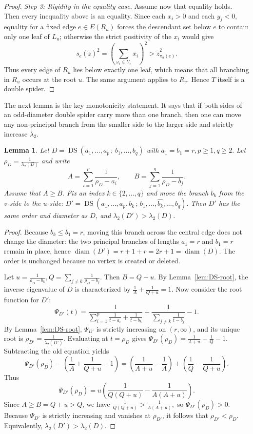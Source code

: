 \documentclass[11pt]{article}
\newtheorem{lemma}[theorem]{Lemma}
\theoremstyle{remark}
\newcommand{\diam}{\operatorname{diam}}
\newcommand{\DS}{\operatorname{DS}}
\begin{document}
\begin{proof}
\smallskip
\noindent\emph{Step 3: Rigidity in the equality case.}
Assume now that equality holds. Then every inequality above is an equality. Since each $x_i>0$
and each $y_j<0$, equality for a fixed edge $e\in E(R_u)$ forces the descendant set below $e$ to
contain only one leaf of $L_u$; otherwise the strict positivity of the $x_i$ would give
$$
s_e(\widetilde z)^2=
\left(\sum_{\omega_i\in U_e}x_i\right)^2>
\widetilde z_{\pi_u(e)}^2.
$$
Thus every edge of $R_u$ lies below exactly one leaf, which means that all branching in $R_u$
occurs at the root $u$. The same argument applies to $R_v$. Hence $T$ itself is a double spider.
\end{proof}

The next lemma is the key monotonicity statement.
It says that if both sides of an odd-diameter double spider carry more than one branch, then one can move any non-principal branch from the smaller side to the larger side and strictly increase $\lambda_2$.

\begin{lemma}\label{lem:arm-transfer}
Let
$D=\DS(a_1,\dots,a_p\,;\,b_1,\dots,b_q)$
with
$a_1=b_1=r, p\ge 1, q\ge 2.$
Let
$\rho_D=\frac{1}{\lambda_2(D)}$
and write
$$
A=\sum_{i=1}^p \frac{1}{\rho_D-a_i},
\qquad
B=\sum_{j=1}^q \frac{1}{\rho_D-b_j}.
$$
Assume that
$A\ge B.$
Fix an index $k\in\{2,\dots,q\}$ and move the branch $b_k$ from the $v$-side to the $u$-side:
$D'=\DS(a_1,\dots,a_p,b_k\,;\,b_1,\dots,\widehat{b_k},\dots,b_q).$
Then $D'$ has the same order and diameter as $D$, and
$\lambda_2(D')>\lambda_2(D).$
\end{lemma}

\begin{proof}
Because $b_k\le b_1=r$, moving this branch across the central edge does not change the
diameter: the two principal branches of lengths $a_1=r$ and $b_1=r$ remain in place, hence
$\diam(D')=r+1+r=2r+1=\diam(D).$
The order is unchanged because no vertex is created or deleted.

Let $u=\frac{1}{\rho_D-b_k},
Q=\sum_{j\ne k} \frac{1}{\rho_D-b_j}.$
Then
$B=Q+u.$
By Lemma~\ref{lem:DS-root}, the inverse eigenvalue of $D$ is characterized by
$\frac1{A}+\frac1{Q+u}=1.$
Now consider the root function for $D'$:
$$
\Psi_{D'}(t)=
\frac{1}{\displaystyle \sum_{i=1}^p \frac1{t-a_i}+\frac1{t-b_k}}
+
\frac{1}{\displaystyle \sum_{j\ne k} \frac1{t-b_j}}
-1.
$$
By Lemma~\ref{lem:DS-root}, $\Psi_{D'}$ is strictly increasing on $(r,\infty)$, and its unique root is
$\rho_{D'}=\frac{1}{\lambda_2(D')}.$
Evaluating at $t=\rho_D$ gives
$\Psi_{D'}(\rho_D)=\frac1{A+u}+\frac1Q-1.$
Subtracting the old equation yields
$$
\Psi_{D'}(\rho_D)-\left(\frac1A+\frac1{Q+u}-1\right)
=
\left(\frac1{A+u}-\frac1A\right)
+
\left(\frac1Q-\frac1{Q+u}\right).
$$
Thus
$$
\Psi_{D'}(\rho_D)
=u\left(\frac1{Q(Q+u)}-\frac1{A(A+u)}\right).
$$
Since $A\ge B=Q+u>Q$, we have
$\frac1{Q(Q+u)}>\frac1{A(A+u)},$
so $\Psi_{D'}(\rho_D)>0$.
Because $\Psi_{D'}$ is strictly increasing and vanishes at $\rho_{D'}$, it follows that
$\rho_{D'}<\rho_D.$
Equivalently,
$\lambda_2(D')>\lambda_2(D).$
\end{proof}
\end{document}
